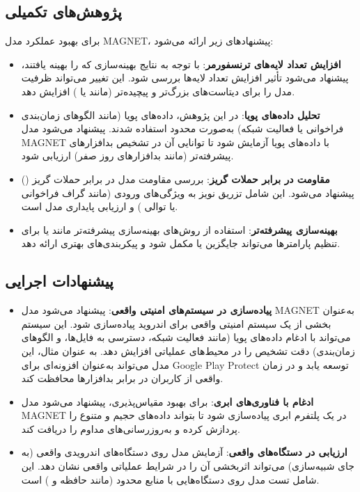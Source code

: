 \subsection{پژوهش‌های تکمیلی}
برای بهبود عملکرد مدل MAGNET، پیشنهادهای زیر ارائه می‌شود:
\begin{itemize}
    \item \textbf{افزایش تعداد لایه‌های ترنسفورمر}: با توجه به نتایج بهینه‌سازی که  را بهینه یافتند، پیشنهاد می‌شود تأثیر افزایش تعداد لایه‌ها بررسی شود. این تغییر می‌تواند ظرفیت مدل را برای دیتاست‌های بزرگ‌تر و پیچیده‌تر (مانند  یا  \cite{AndroZoo}) افزایش دهد.
    \item \textbf{تحلیل داده‌های پویا}: در این پژوهش، داده‌های پویا (مانند الگوهای زمان‌بندی فراخوانی  یا فعالیت شبکه) به‌صورت محدود استفاده شدند. پیشنهاد می‌شود مدل MAGNET با داده‌های پویا آزمایش شود تا توانایی آن در تشخیص بدافزارهای پیشرفته‌تر (مانند بدافزارهای روز صفر) ارزیابی شود.
    \item \textbf{مقاومت در برابر حملات گریز}: بررسی مقاومت مدل در برابر حملات گریز () پیشنهاد می‌شود. این شامل تزریق نویز به ویژگی‌های ورودی (مانند گراف فراخوانی یا توالی ) و ارزیابی پایداری مدل است.
    \item \textbf{بهینه‌سازی پیشرفته‌تر}: استفاده از روش‌های بهینه‌سازی پیشرفته‌تر مانند  یا  برای تنظیم پارامترها می‌تواند جایگزین یا مکمل  \cite{Optuna2019} شود و پیکربندی‌های بهتری ارائه دهد.
\end{itemize}

\subsection{پیشنهادات اجرایی}
\begin{itemize}
    \item \textbf{پیاده‌سازی در سیستم‌های امنیتی واقعی}: پیشنهاد می‌شود مدل MAGNET به‌عنوان بخشی از یک سیستم امنیتی واقعی برای اندروید پیاده‌سازی شود. این سیستم می‌تواند با ادغام داده‌های پویا (مانند فعالیت شبکه، دسترسی به فایل‌ها، و الگوهای زمان‌بندی) دقت تشخیص را در محیط‌های عملیاتی افزایش دهد. به عنوان مثال، این مدل می‌تواند به‌عنوان افزونه‌ای برای Google Play Protect توسعه یابد و در زمان واقعی از کاربران در برابر بدافزارها محافظت کند.
    \item \textbf{ادغام با فناوری‌های ابری}: برای بهبود مقیاس‌پذیری، پیشنهاد می‌شود مدل MAGNET در یک پلتفرم ابری پیاده‌سازی شود تا بتواند داده‌های حجیم و متنوع را پردازش کرده و به‌روزرسانی‌های مداوم را دریافت کند.
    \item \textbf{ارزیابی در دستگاه‌های واقعی}: آزمایش مدل روی دستگاه‌های اندرویدی واقعی (به جای شبیه‌سازی) می‌تواند اثربخشی آن را در شرایط عملیاتی واقعی نشان دهد. این شامل تست مدل روی دستگاه‌هایی با منابع محدود (مانند حافظه و ) است.
\end{itemize}

